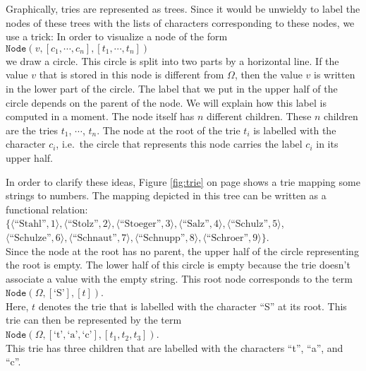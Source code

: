 Graphically, tries are represented as trees.  Since it would be unwieldy to label the nodes of these
trees with the lists of characters corresponding to these nodes, we use a trick:  In order to
visualize a node of the form \\[0.2cm]
\hspace*{1.3cm} 
$\texttt{Node}(v, [c_1, \cdots, c_n], [t_1, \cdots, t_n])$ \\[0.2cm]
we draw a circle.  This circle is split into two parts by a horizontal line.
If the value  $v$ that is stored in this node is different from $\Omega$, then the value $v$ is
written in the lower part of the circle.  The label that we put in the upper half of the circle
depends on the parent of the node.  We will explain how this label is computed in a moment.
The node itself has $n$ different children.  These $n$ children are the tries
$t_1$, $\cdots$, $t_n$.  The node at the root of the trie $t_i$ is labelled with the character $c_i$,
i.e.~the circle that represents this node carries the label $c_i$ in its upper half.

In order to clarify these ideas, Figure  \ref{fig:trie} on page \pageref{fig:trie} shows a trie
mapping some strings to numbers.  The mapping depicted in this tree can be written as a functional
relation: 
\\[0.2cm]
\hspace*{1.3cm} $ \bigl\{ \langle \textrm{``Stahl''},   1  \rangle, \langle \textrm{``Stolz''},     2  \rangle, \langle \textrm{``Stoeger''},   3  \rangle, 
             \langle \textrm{``Salz''},      4  \rangle, \langle \textrm{``Schulz''},    5  \rangle$, \\[0.2cm]
\hspace*{1.5cm} $\langle \textrm{``Schulze''},   6  \rangle, \langle \textrm{``Schnaut''},   7  \rangle, 
  \langle \textrm{``Schnupp''},   8  \rangle, 
  \langle \textrm{``Schroer''},   9  \rangle\}$. \\[0.2cm]
Since the node at the root has no parent, the upper half of  the circle representing the root is
empty.  The lower half of  this circle is empty because the trie doesn't associate a value with the
empty string.  This root node corresponds to the term 
\\[0.2cm]
\hspace*{1.3cm}
 $\texttt{Node}(\Omega,[\textrm{`S'}], [t])$. 
\\[0.2cm]
Here,  $t$ denotes the trie that is labelled with the character  ``S'' at its root.
This trie can then be represented by the term  \\[0.2cm]
\hspace*{1.3cm} 
$\texttt{Node}(\Omega,[\textrm{`t'},\textrm{`a'},\textrm{`c'}], [t_1, t_2, t_3])$. \\[0.2cm]
This trie has three children that are labelled with the characters  ``t'', ``a'', and ``c''.

